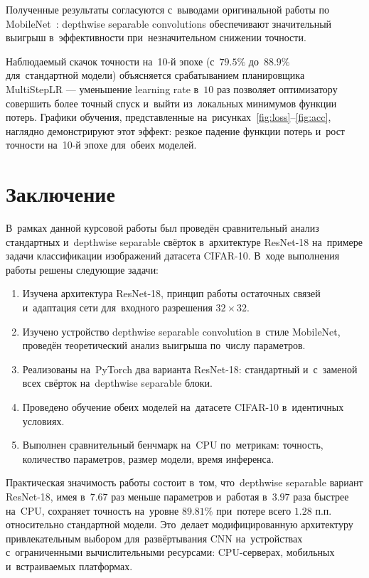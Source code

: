 Полученные результаты согласуются с~выводами оригинальной работы по MobileNet~\cite{mobilenet}: depthwise separable convolutions обеспечивают значительный выигрыш в~эффективности при~незначительном снижении точности.

Наблюдаемый скачок точности на~10-й эпохе (с~$79.5\%$ до~$88.9\%$ для~стандартной модели) объясняется срабатыванием планировщика MultiStepLR — уменьшение learning rate в~$10$ раз позволяет оптимизатору совершить более точный спуск и~выйти из~локальных минимумов функции потерь. Графики обучения, представленные на~рисунках~\ref{fig:loss}--\ref{fig:acc}, наглядно демонстрируют этот эффект: резкое падение функции потерь и~рост точности на~10-й эпохе для~обеих моделей.

\newpage
\section*{Заключение}

В~рамках данной курсовой работы был проведён сравнительный анализ стандартных и~depthwise separable свёрток в~архитектуре ResNet-18 на~примере задачи классификации изображений датасета CIFAR-10. В~ходе выполнения работы решены следующие задачи:

\begin{enumerate}
    \item Изучена архитектура ResNet-18, принцип работы остаточных связей и~адаптация сети для~входного разрешения $32 \times 32$.
    \item Изучено устройство depthwise separable convolution в~стиле MobileNet, проведён теоретический анализ выигрыша по~числу параметров.
    \item Реализованы на~PyTorch два варианта ResNet-18: стандартный и~с~заменой всех свёрток на~depthwise separable блоки.
    \item Проведено обучение обеих моделей на~датасете CIFAR-10 в~идентичных условиях.
    \item Выполнен сравнительный бенчмарк на~CPU по~метрикам: точность, количество параметров, размер модели, время инференса.
\end{enumerate}

Практическая значимость работы состоит в~том, что~depthwise separable вариант ResNet-18, имея в~$7.67$ раз меньше параметров и~работая в~$3.97$ раза быстрее на~CPU, сохраняет точность на~уровне $89.81\%$ при~потере всего $1.28$ п.п. относительно стандартной модели. Это~делает модифицированную архитектуру привлекательным выбором для~развёртывания CNN на~устройствах с~ограниченными вычислительными ресурсами: CPU-серверах, мобильных и~встраиваемых платформах.

